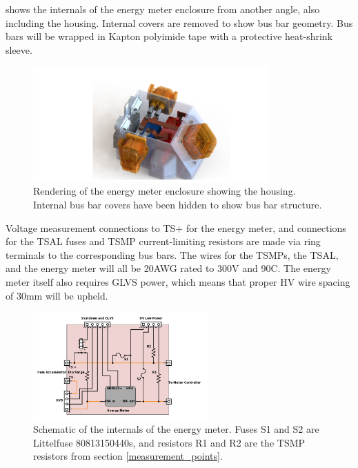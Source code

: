 \documentclass{article}
\begin{document}
 shows the internals of the energy meter enclosure from another angle, also including the housing. Internal covers are removed to show bus bar geometry. Bus bars will be wrapped in Kapton polyimide tape with a protective heat-shrink sleeve.

\begin{figure}[H]
\centering
\includegraphics[width=0.8\textwidth]{EnergyMeterInternalsNoCovers}
\caption{Rendering of the energy meter enclosure showing the housing. Internal bus bar covers have been hidden to show bus bar structure.}
\label{fig:energy_meter_internals_enclosure}
\end{figure}

Voltage measurement connections to TS+ for the energy meter, and connections for the TSAL fuses and TSMP current-limiting resistors are made via ring terminals to the corresponding bus bars. The wires for the TSMPs, the TSAL, and the energy meter will all be 20AWG rated to 300V and 90\textdegree C. The energy meter itself also requires GLVS power, which means that proper HV wire spacing of 30mm will be upheld. 



\begin{figure}[H]
\centering
\includegraphics[width=0.6\textwidth]{Energy-Meter-Schematic-w-HVD.png}
\caption{Schematic of the internals of the energy meter. Fuses S1 and S2 are Littelfuse 80813150440s, and resistors R1 and R2 are the TSMP resistors from section \ref{measurement_points}.}
\label{fig:energy_meter_schematic}
\end{figure}
\end{document}

